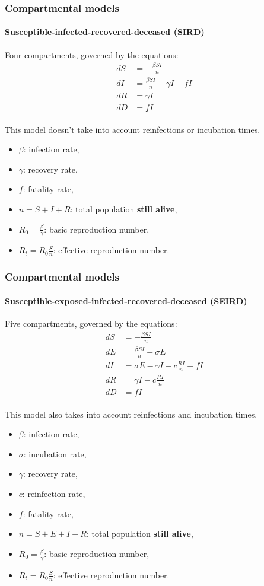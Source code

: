 \documentclass[aspectratio=43]{beamer}
\begin{document}
\begin{frame}
	\frametitle{Compartmental models}
	\framesubtitle{Susceptible-infected-recovered-deceased (SIRD)}
	Four compartments, governed by the equations:
	\begin{align*}
	dS &= -\frac{\beta S I}{n}\\
	dI &= \frac{\beta S I}{n} - \gamma I - f I\\
	dR &= \gamma I\\
	dD &= f I\\
	\end{align*}
	
	{\small This model doesn't take into account reinfections or incubation times.}
	
	\begin{itemize}
		\item $\beta$: infection rate,
		\item $\gamma$: recovery rate,
		\item $f$: fatality rate,
		\item $n = S + I + R$: total population \textbf{still alive},
		\item $R_0 = \frac{\beta}{\gamma}$: basic reproduction number,
		\item $R_t = R_0 \frac{S}{n}$: effective reproduction number.
	\end{itemize}
\end{frame}

\begin{frame}
	\frametitle{Compartmental models}
	\framesubtitle{Susceptible-exposed-infected-recovered-deceased (SEIRD)}
	{\tiny Five compartments, governed by the equations:
	\begin{align*}
	dS &= -\frac{\beta S I}{n}\\
	dE &= \frac{\beta S I}{n} - \sigma E\\
	dI &= \sigma E - \gamma I + c \frac{R I}{n} - f I\\
	dR &= \gamma I - c \frac{R I}{n}\\
	dD &= f I\\
	\end{align*}
	
	This model also takes into account reinfections and incubation times.}
	
	\begin{itemize}
		\item $\beta$: infection rate,
		\item $\sigma$: incubation rate,
		\item $\gamma$: recovery rate,
		\item $c$: reinfection rate,
		\item $f$: fatality rate,
		\item $n = S + E + I + R$: total population \textbf{still alive},
		\item $R_0 = \frac{\beta}{\gamma}$: basic reproduction number,
		\item $R_t = R_0 \frac{S}{n}$: effective reproduction number.
	\end{itemize}
\end{frame}
\end{document}
